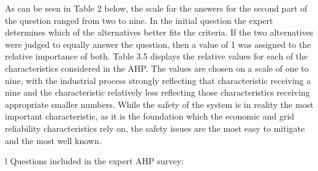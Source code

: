 \documentclass[12pt]{UIdahoMastersThesis}
\begin{document}
As can be seen in Table 2 below, the scale for the answers for the second part of the question ranged from two to  nine.  In the initial question the expert determines which of the alternatives better fits the criteria.  If the two alternatives were judged to equally answer the question, then a value of 1 was assigned to the relative importance of both. Table 3.5 displays the relative values for each of the characteristics considered in the AHP. The values are chosen on a scale of one to nine, with the industrial process strongly reflecting that characteristic receiving a nine and the characteristic relatively less reflecting those characteristics receiving appropriate smaller numbers. While the safety of the system is in reality the most important characteristic, as it is the foundation which the economic and grid reliability characteristics rely on, the safety issues are the most easy to mitigate and the most well known.

\begin{table}[h!]
\centering
\caption{Example of questions given in the Expert AHP survey}
\label{my-label}
\begin{tabular}{l}
Questions included in the expert AHP survey:                                                                                   \\ \hline
{} \\ \hline
\end{tabular}
\end{table}
\end{document}
